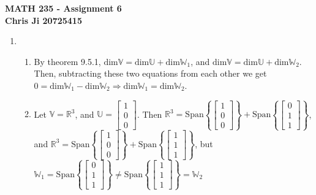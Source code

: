 \documentclass[10pt,english]{article}
\begin{document}
\noindent \begin{center}
\textbf{\large{}MATH 235 - Assignment 6}\\
\textbf{\large{}Chris Ji 20725415}
\par\end{center}{\large \par}
\medskip{}

\begin{enumerate}
\item \begin{enumerate}
    \item By theorem 9.5.1, $\text{dim}\mathbb{V}=\text{dim}\mathbb{U}+\text{dim}\mathbb{W}_1$, and $\text{dim}\mathbb{V}=\text{dim}\mathbb{U}+\text{dim}\mathbb{W}_2$. Then, subtracting these two equations from each other we get $0=\text{dim}\mathbb{W}_1-\text{dim}\mathbb{W}_2\Rightarrow\text{dim}\mathbb{W}_1=\text{dim}\mathbb{W}_2$. 
    \item Let $\mathbb{V}=\mathbb{R}^3$, and $\mathbb{U}=\begin{bmatrix}1\\0\\0\end{bmatrix}$. Then $\mathbb{R}^3=\text{Span}\left\{\begin{bmatrix}1\\0\\0\end{bmatrix}\right\}+\text{Span}\left\{\begin{bmatrix}0\\1\\1\end{bmatrix}\right\}$, and $\mathbb{R}^3=\text{Span}\left\{\begin{bmatrix}1\\0\\0\end{bmatrix}\right\}+\text{Span}\left\{\begin{bmatrix}1\\1\\1\end{bmatrix}\right\}$, but $\mathbb{W}_1=\text{Span}\left\{\begin{bmatrix}0\\1\\1\end{bmatrix}\right\}\neq\text{Span}\left\{\begin{bmatrix}1\\1\\1\end{bmatrix}\right\}=\mathbb{W}_2$
\end{enumerate}


\end{enumerate}
\end{document}
